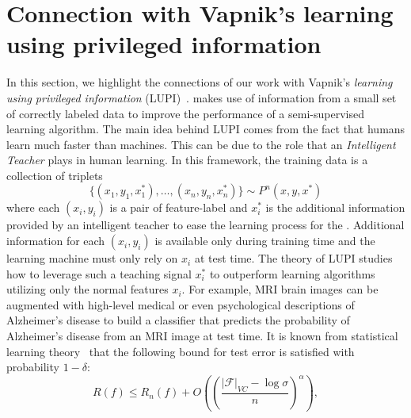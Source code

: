 \section{Connection with Vapnik's learning using privileged information}
\label{sec:LUPI}
In this section, we highlight the connections of our work with Vapnik's \emph{learning using privileged information} (LUPI)~\citep{vapnik2009new, vapnik2015learning}. \fwl makes use of information from a small set of correctly labeled data to improve the performance of a semi-supervised learning algorithm. The main idea behind LUPI comes from the fact that humans learn much faster than machines. This can be due to the role that an \emph{Intelligent Teacher} plays in human learning. In this framework, the training data is a collection of triplets
\begin{equation}
    \{(x_1, y_1, x_1^*),\ldots,(x_n,y_n,x_n^*)\}\mathtt{\sim}P^n(x,y,x^*)
\end{equation}
where each ${(x_i,y_i)}$ is a pair of feature-label and $x_i^*$ is the additional information provided by an intelligent teacher to ease the learning process for the \std. Additional information for each ${(x_i,y_i)}$ is available only during training time and the learning machine must only rely on $x_i$ at test time. The theory of LUPI studies how to leverage such a teaching signal $x_i^*$ to outperform learning algorithms utilizing only the normal features $x_i$. For example, MRI brain images can be augmented with high-level medical or even psychological descriptions of Alzheimer's disease to build a classifier that predicts the probability of Alzheimer's disease from an MRI image at test time.
It is known from statistical learning theory~\citep{Vapnik1998} that the following bound for test error is satisfied with probability $1-\delta$:
\begin{equation}
\label{eq:LUPI_error_bound}
    R(f) \leq R_n(f) + O\left(\left(\frac{|\mathcal{F}|_{VC}-\log \sigma}{n}\right)^\alpha\right),
\end{equation}
